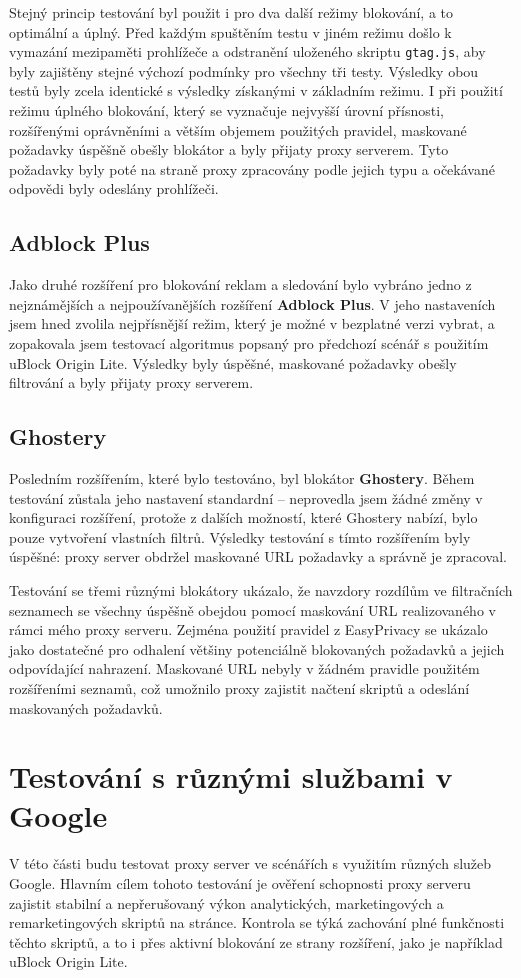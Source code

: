 Stejný princip testování byl použit i pro dva další režimy blokování, a to optimální a úplný. Před každým spuštěním testu v jiném režimu došlo k vymazání mezipaměti prohlížeče a odstranění uloženého skriptu \texttt{gtag.js}, aby byly zajištěny stejné výchozí podmínky pro všechny tři testy. Výsledky obou testů byly zcela identické s výsledky získanými v základním režimu. I při použití režimu úplného blokování, který se vyznačuje nejvyšší úrovní přísnosti, rozšířenými oprávněními a větším objemem použitých pravidel, maskované požadavky úspěšně obešly blokátor a byly přijaty proxy serverem. Tyto požadavky byly poté na straně proxy zpracovány podle jejich typu a očekávané odpovědi byly odeslány prohlížeči.

\subsection*{Adblock Plus}
Jako druhé rozšíření pro blokování reklam a sledování bylo vybráno jedno z nejznámějších a nejpoužívanějších rozšíření \textbf{Adblock Plus}. V jeho nastaveních jsem hned zvolila nejpřísnější režim, který je možné v bezplatné verzi vybrat, a zopakovala jsem testovací algoritmus popsaný pro předchozí scénář s použitím uBlock Origin Lite. Výsledky byly úspěšné, maskované požadavky obešly filtrování a byly přijaty proxy serverem.

\subsection*{Ghostery}
Posledním rozšířením, které bylo testováno, byl blokátor \textbf{Ghostery}. Během testování zůstala jeho nastavení standardní -- neprovedla jsem žádné změny v konfiguraci rozšíření, protože z dalších možností, které Ghostery nabízí, bylo pouze vytvoření vlastních filtrů. Výsledky testování s tímto rozšířením byly úspěšné: proxy server obdržel maskované URL požadavky a správně je zpracoval. 

Testování se třemi různými blokátory ukázalo, že navzdory rozdílům ve filtračních seznamech se všechny úspěšně obejdou pomocí maskování URL realizovaného v rámci mého proxy serveru. Zejména použití pravidel z EasyPrivacy se ukázalo jako dostatečné pro odhalení většiny potenciálně blokovaných požadavků a jejich odpovídající nahrazení. Maskované URL nebyly v žádném pravidle použitém rozšířeními seznamů, což umožnilo proxy zajistit načtení skriptů a odeslání maskovaných požadavků. 

\section{Testování s různými službami v Google}
V této části budu testovat proxy server ve scénářích s využitím různých služeb Google. Hlavním cílem tohoto testování je ověření schopnosti proxy serveru zajistit stabilní a nepřerušovaný výkon analytických, marketingových a remarketingových skriptů na stránce. Kontrola se týká zachování plné funkčnosti těchto skriptů, a to i přes aktivní blokování ze strany rozšíření, jako je například uBlock Origin Lite.

